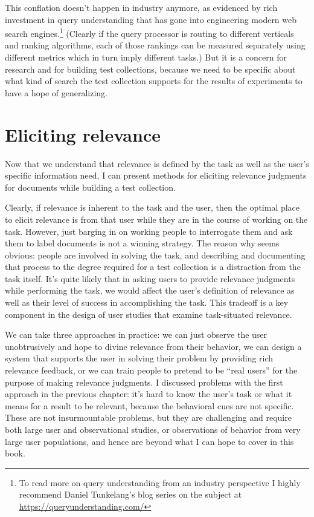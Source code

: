 \documentclass[nobib]{tufte-book}
\begin{document}
This conflation doesn't happen in industry anymore, as evidenced by rich investment in query understanding that has gone into engineering modern web search engines.\footnote{To read more on query understanding from an industry perspective I highly recommend Daniel Tunkelang's blog series on the subject at \url{https://queryunderstanding.com/}} (Clearly if the query processor is routing to different verticals and ranking algorithms, each of those rankings can be measured separately using different metrics which in turn imply different tasks.)  But it is a concern for research and for building test collections, because we need to be specific about what kind of search the test collection supports for the results of experiments to have a hope of generalizing.

\chapter{Eliciting relevance}

Now that we understand that relevance is defined by the task as well as the user's specific information need, I can present methods for eliciting relevance judgments for documents while building a test collection.

Clearly, if relevance is inherent to the task and the user, then the optimal place to elicit relevance is from that user while they are in the course of working on the task.  However, just barging in on working people to interrogate them and ask them to label documents is not a winning strategy.  The reason why seems obvious: people are involved in solving the task, and describing and documenting that process to the degree required for a test collection is a distraction from the task itself.  It's quite likely that in asking users to provide relevance judgments while performing the task, we would affect the user's definition of relevance as well as their level of success in accomplishing the task.  This tradeoff is a key component in the design of user studies that examine task-situated relevance.

We can take three approaches in practice: we can just observe the user unobtrusively and hope to divine relevance from their behavior, we can design a system that supports the user in solving their problem by providing rich relevance feedback, or we can train people to pretend to be ``real users'' for the purpose of making relevance judgments.  I discussed problems with the first approach in the previous chapter: it's hard to know the user's task or what it means for a result to be relevant, because the behavioral cues are not specific.  These are not insurmountable problems, but they are challenging and require both large user and observational studies, or observations of behavior from very large user populations, and hence are beyond what I can hope to cover in this book.
\end{document}
